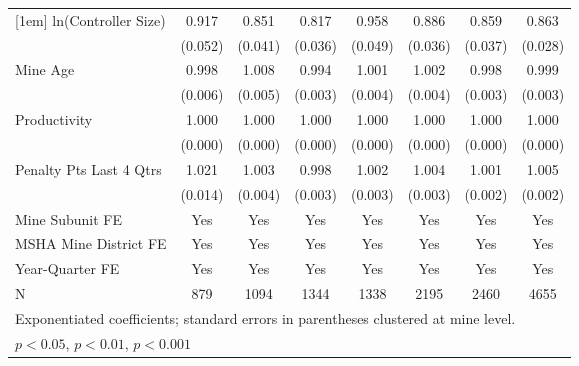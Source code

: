 {\begin{tabular}{l*{7}{c}}
[1em]
ln(Controller Size)      &       0.917         &       0.851\sym{***}&       0.817\sym{***}&       0.958         &       0.886\sym{**} &       0.859\sym{***}&       0.863\sym{***}\\
                         &     (0.052)         &     (0.041)         &     (0.036)         &     (0.049)         &     (0.036)         &     (0.037)         &     (0.028)         \\
[1em]
Mine Age                 &       0.998         &       1.008         &       0.994         &       1.001         &       1.002         &       0.998         &       0.999         \\
                         &     (0.006)         &     (0.005)         &     (0.003)         &     (0.004)         &     (0.004)         &     (0.003)         &     (0.003)         \\
[1em]
Productivity             &       1.000         &       1.000         &       1.000         &       1.000         &       1.000         &       1.000         &       1.000         \\
                         &     (0.000)         &     (0.000)         &     (0.000)         &     (0.000)         &     (0.000)         &     (0.000)         &     (0.000)         \\
[1em]
Penalty Pts Last 4 Qtrs  &       1.021         &       1.003         &       0.998         &       1.002         &       1.004         &       1.001         &       1.005\sym{*}  \\
                         &     (0.014)         &     (0.004)         &     (0.003)         &     (0.003)         &     (0.003)         &     (0.002)         &     (0.002)         \\
[1em]
Mine Subunit FE          &         Yes         &         Yes         &         Yes         &         Yes         &         Yes         &         Yes         &         Yes         \\
[1em]
MSHA Mine District FE    &         Yes         &         Yes         &         Yes         &         Yes         &         Yes         &         Yes         &         Yes         \\
[1em]
Year-Quarter FE          &         Yes         &         Yes         &         Yes         &         Yes         &         Yes         &         Yes         &         Yes         \\
\hline
N                        &         879         &        1094         &        1344         &        1338         &        2195         &        2460         &        4655         \\
\hline\hline
\multicolumn{8}{l}{\footnotesize Exponentiated coefficients; standard errors in parentheses clustered at mine level.}\\
\multicolumn{8}{l}{\footnotesize \sym{*} \(p<0.05\), \sym{**} \(p<0.01\), \sym{***} \(p<0.001\)}\\
\end{tabular}
}
